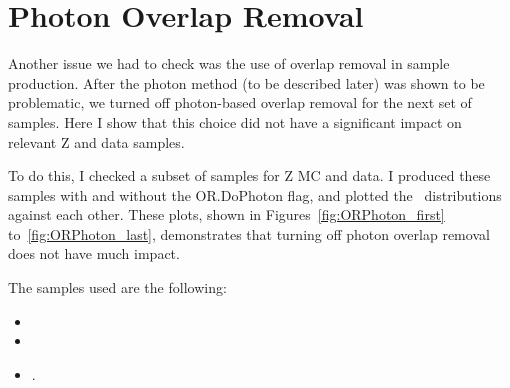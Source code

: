 \section{Photon Overlap Removal}

Another issue we had to check was the use of overlap removal in sample production. After the photon method (to be described later) was shown to be problematic, we turned off photon-based overlap removal for the next set of samples. Here I show that this choice did not have a significant impact on relevant Z and data samples.

To do this, I checked a subset of samples for Z MC and data. I produced these samples with and without the OR.DoPhoton flag, and plotted the \MET\ distributions against each other. These plots, shown in Figures~\ref{fig:ORPhoton_first} to~\ref{fig:ORPhoton_last}, demonstrates that turning off photon overlap removal does not have much impact.

The samples used are the following:

\begin{itemize}
    \item {}
    \item {}
    \item {}.
\end{itemize}

